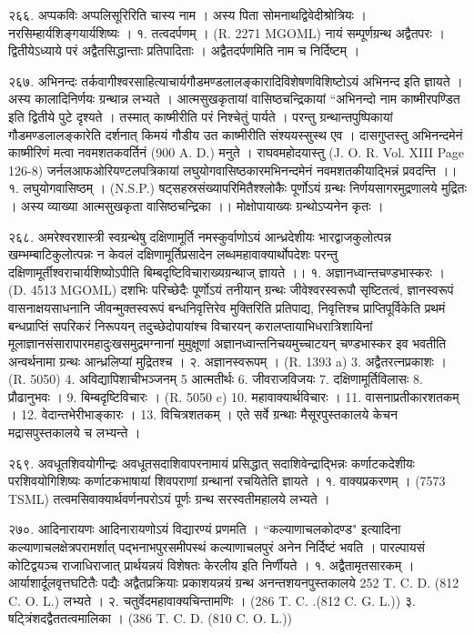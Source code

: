 २६६. अप्पकविः
अप्पलिसूरिरिति चास्य नाम । अस्य पिता सोमनाथद्विवेदीश्रोत्रियः । नरसिम्हार्यशिङ्गयार्यशिष्यः ।
१. तत्वदर्पणम् । (R. 2271 MGOML) नायं सम्पूर्णग्रन्थ अद्वैतपरः । द्वितीयेऽध्याये परं अद्वैतसिद्धान्ताः प्रतिपादिताः । अद्वैतदर्पणमिति नाम च निर्दिष्टम् ।

२६७. अभिनन्दः
तर्कवागीश्वरसाहित्याचार्यगौडमण्डलालङ्कारादिविशेषणविशिष्टोऽयं अभिनन्द इति ज्ञायते । अस्य कालादिनिर्णयः ग्रन्थान्न लभ्यते । आत्मसुखकृतायां वासिष्ठचन्द्रिकायां ``अभिनन्दो नाम काष्मीरपण्डित इति द्वितीये पुटे दृश्यते । तस्मात् काष्मीरीति परं निश्चेतुं पार्यते । परन्तु ग्रन्थान्तपुष्पिकायां गौडमण्डलालङ्कारेति दर्शनात् किमयं गौडीय उत काष्मीरीति संश्ययस्सुस्थ एव । दासगुप्तस्तु अभिनन्दमेनं काष्मीरिणं मत्वा नवमशतकवर्तिनं (900 A. D.) मनुते । राघवमहोदयास्तु (J. O. R. Vol. XIII Page 126-8) जर्नलआफओरियण्टलपत्रिकायां लघुयोगवासिष्ठकारमभिनन्दमेनं नवमशतकीयाद्भिन्नं प्रवदन्ति ।।
१. लघुयोगवासिष्ठम् । (N.S.P.)
षट्सहस्रसंख्यापरिमितैश्श्लोकैः पूर्णोऽयं ग्रन्थः निर्णयसागरमुद्रणालये मुद्रितः । अस्य व्याख्या आत्मसुखकृता वासिष्ठचन्द्रिका ।। मोक्षोपायाख्यः ग्रन्थोऽप्यनेन कृतः । 

२६८. अमरेश्वरशास्त्री
स्वग्रन्थेषु दक्षिणामूर्ति नमस्कुर्वाणोऽयं आन्ध्रदेशीयः भारद्वाजकुलोत्पन्न खम्भम्बाटिकुलोत्पन्नः न केवलं दक्षिणामूर्तिप्रसादेन लब्धमहावाक्यार्थोपदेशः परन्तु दक्षिणामूर्तीश्वराचार्यशिष्योऽपीति बिम्बदृष्टिविचाराख्यग्रन्थाज् ज्ञायते ।।
१. अज्ञानध्वान्तचण्डभास्करः । (D. 4513 MGOML) दशभिः परिच्छेदैः पूर्णोऽयं तनीयान् ग्रन्थः जीवेश्वरस्वरूपौ सृष्टितत्वं, ज्ञानस्वरूपं वासनाक्षयसाधनानि जीवन्मुक्तस्वरूपं बन्धनिवृत्तिरेव मुक्तिरिति प्रतिपाद्य, निवृत्तिश्च प्राप्तिपूर्विकेति प्रथमं बन्धप्राप्तिं सपरिकरं निरूपयन् तदुच्छेदोपायांश्च विचारयन् करालप्तायाभिधरात्रिशायिनां मूलाज्ञानसंसारापारमहादुःखसमुद्रमग्नानां मुमुक्षूणां अज्ञानध्वान्तनिचयमुच्चाटयन् चण्डभास्कर इव भवतीति अन्वर्थनामा ग्रन्थः आन्ध्रलिप्यां मुद्रितश्च ।
२. अज्ञानस्वरूपम् । (R. 1393 a) 3. अद्वैतरत्नप्रकाशः । (R. 5050) 4. अविद्यापिशाचीभञ्जनम् 5 आत्मतीर्थः 6. जीवराजविजयः 7. दक्षिणामूर्तिविलासः 8. प्रौढानुभवः । 9. बिम्बदृष्टिविचारः । (R. 5050 c) 10. महावाक्यार्थविचारः । 11. वासनाप्रतीकारशतकम् । 12. वेदान्तभेरीभाङ्कारः । 13. विचित्रशतकम् । एते सर्वे ग्रन्थाः मैसूरपुस्तकालये केचन मद्रासपुस्तकालये च लभ्यन्ते ।

२६९. अवधूतशिवयोगीन्द्रः
अवधूतसदाशिवापरनामायं प्रसिद्धात् सदाशिवेन्द्राद्भिन्नः कर्णाटकदेशीयः परशिवयोगिशिष्यः कर्णाटकभाषायां शिवपराणां ग्रन्थानां रचयितेति ज्ञायते ।
१. वाक्यप्रकरणम् । (7573 TSML) तत्वमसिवाक्यार्थवर्णनपरोऽयं पूर्णः ग्रन्थ सरस्वतीमहालये लभ्यते ।

२७०. आदिनारायणः
आदिनारायणोऽयं विद्यारण्यं प्रणमति । ``कल्याणाचलकोदण्ड" इत्यादिना कल्याणाचलक्षेत्रपरामर्शात् पद्भनाभपुरसमीपस्थं कल्याणाचलपुरं अनेन निर्दिष्टं भवति । पारल्पायसं कोटिद्वयञ्च राजाधिराजात् प्रार्थयन्नयं विशेषतः केरलीय इति निर्णीयते ।
१. अद्वैतामृतसारकम् । आर्याशार्दूलवृत्तघटितैः पद्यैः अद्वैतप्रक्रियाः प्रकाशयन्नयं ग्रन्थ अनन्तशयनपुस्तकालये 252 T. C. D. (812 C. O. L.) लभ्यते ।
२. चतुर्वेदमहावाक्यचिन्तामणिः । (286 T. C. .(812 C. G. L.))
३. षट्त्रिंशदद्वैततत्वमालिका । (386 T. C. D. (810 C. O. L.))

